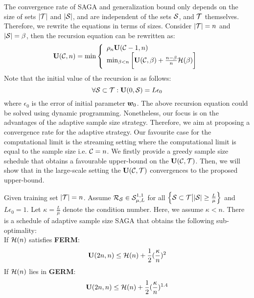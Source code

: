 \documentclass{article}
\begin{document}
The convergence rate of SAGA and generalization bound only depends on
the size of sets $|\T|$ and $|\S|$, and are independent of the sets $\S$,
and $\T$ themselves. Therefore, we rewrite the equations in terms of sizes. Consider
$|\T| = n$ and $|\S| = \beta$, then the recursion equation can be rewritten as: 
\begin{equation} \label{eq:recursion}
	\U(\C,n) = \min
\left\{
	\begin{array}{ll}
		 \rho_{n} \U(\C-1,n)\\
		\min_{\beta < n } \bigg[\U(\C,\beta) + \frac{n - \beta}{n}
		\bound(\beta) \bigg]
	\end{array}
\right.
\end{equation}
 Note
that the initial value of the recursion is as follows: 
\begin{equation*}
	\forall \S \subset \T: \U(0,\S) = L \epsilon_0 
\end{equation*}
where $\epsilon_0$ is the error of initial parameter $\w_0$. 
 The above recursion equation could be solved using dynamic
 programming. Nonetheless, our focus is on the advantages of the adaptive sample
 size strategy.
Therefore, we aim at proposing a convergence rate for the adaptive strategy.
Our favourite case for the computational limit is the streaming setting where
the computational limit is equal to the sample size i.e. $\C = n$. We firstly
provide a greedy sample size schedule that obtains a favourable upper-bound on
the $\U(\C,\T)$. Then, we will show that in the large-scale setting the
$\U(\C,\T)$ convergences to the proposed upper-bound.
\begin{lemma} \label{lemma:bound_on_u}
	Given training set $|\T| = n$. Assume $\risk_{\S} \in
	\smoothstrong$ for all $\left\{ \S \subset \T \big\vert |\S| \geq \frac{L}{\mu}
	\right\} $ and $L \epsilon_0 = 1$. Let $\kappa = \frac{L}{\mu}$ denote the
	condition number. Here, we assume $\kappa<n$.
	There is a schedule of adaptive sample size SAGA that obtains the
	following sub-optimality:\\
	If $\bound(n)$ satisfies \textbf{FERM}:  
	\begin{equation*}
		\U(2n,n) \leq \bound(n) + \frac{1}{2}(\frac{\kappa}{ n})^2
	\end{equation*}
	If $\bound(n)$ lies in \textbf{GERM}: 
	\begin{equation*}
		\U(2n,n) \leq \bound(n) + \frac{1}{2}(\frac{\kappa}{n})^{1.4}
	\end{equation*}
\end{lemma}
\end{document}
